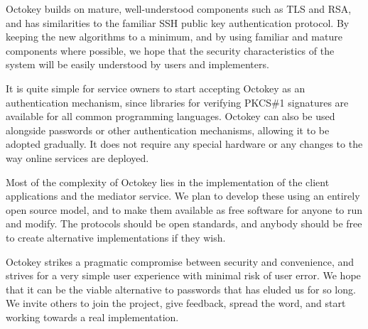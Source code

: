 Octokey builds on mature, well-understood components such as TLS and RSA, and has similarities to
the familiar SSH public key authentication protocol. By keeping the new algorithms to a minimum, and
by using familiar and mature components where possible, we hope that the security characteristics of
the system will be easily understood by users and implementers.

It is quite simple for service owners to start accepting Octokey as an authentication mechanism,
since libraries for verifying PKCS\#1 signatures are available for all common programming languages.
Octokey can also be used alongside passwords or other authentication mechanisms, allowing it to be
adopted gradually. It does not require any special hardware or any changes to the way online
services are deployed.

Most of the complexity of Octokey lies in the implementation of the client applications and the
mediator service. We plan to develop these using an entirely open source model, and to make them
available as free software for anyone to run and modify. The protocols should be open standards, and
anybody should be free to create alternative implementations if they wish.

Octokey strikes a pragmatic compromise between security and convenience, and strives for a very
simple user experience with minimal risk of user error. We hope that it can be the viable
alternative to passwords that has eluded us for so long. We invite others to join the project, give
feedback, spread the word, and start working towards a real implementation.
